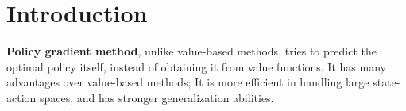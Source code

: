 \section{Introduction}
    \textbf{Policy gradient method}, unlike value-based methods, tries to predict the optimal policy itself,
    instead of obtaining it from value functions. It has many advantages over value-based methods;
    It is more efficient in handling large state-action spaces, and has stronger generalization abilities.
